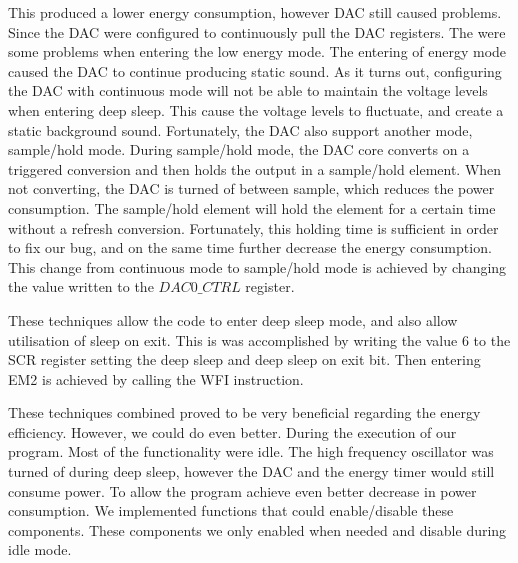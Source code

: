 This produced a lower energy consumption, however DAC still caused problems. Since the DAC were configured to continuously pull the DAC registers. The were some problems when entering the low energy mode. The entering of energy mode caused the DAC to continue producing static sound. As it turns out, configuring the DAC with continuous mode will not be able to maintain the voltage levels when entering deep sleep. This cause the voltage levels to fluctuate, and create a static background sound. Fortunately, the DAC also support another mode, sample/hold mode. During sample/hold mode, the DAC core converts on a triggered conversion and then holds the output in a sample/hold element. When not converting, the DAC is turned of between sample, which reduces the power consumption. The sample/hold element will hold the element for a certain time without a refresh conversion\cite{EFM32GG-rm}. Fortunately, this holding time is sufficient in order to fix our bug, and on the same time further decrease the energy consumption. This change from continuous mode to sample/hold mode is achieved by changing the value written to the $DAC0\_CTRL$ register. 



These techniques allow the code to enter deep sleep mode, and also allow utilisation of sleep on exit. This is was accomplished by writing the value 6 to the SCR register setting the deep sleep and deep sleep on exit bit. Then entering EM2 is achieved by calling the WFI instruction.

These techniques combined proved to be very beneficial regarding the energy efficiency. However, we could do even better. During the execution of our program. Most of the functionality were idle. The high frequency oscillator was turned of during deep sleep, however the DAC and the energy timer would still consume power. To allow the program achieve even better decrease in power consumption. We implemented functions that could enable/disable these components. These components we only enabled when needed and disable during idle mode. 



 

  





   



  
       

 



